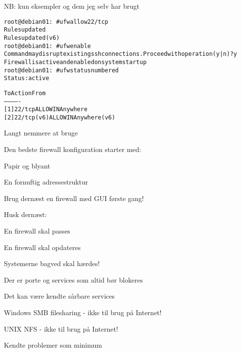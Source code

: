 \documentclass[Screen16to9,17pt]{foils}
\begin{document}
NB: kun eksempler og dem jeg selv har brugt



\begin{alltt}\footnotesize
root@debian01:~# ufw allow 22/tcp
Rules updated
Rules updated (v6)
root@debian01:~# ufw enable
Command may disrupt existing ssh connections. Proceed with operation (y|n)? y
Firewall is active and enabled on system startup
root@debian01:~# ufw status numbered
Status: active

     To                         Action      From
     --                         ------      ----
[ 1] 22/tcp                     ALLOW IN    Anywhere
[ 2] 22/tcp (v6)                ALLOW IN    Anywhere (v6)
\end{alltt}

Langt nemmere at bruge




\begin{list1}
\item Den bedste firewall konfiguration starter med:
\begin{list2}
\item Papir og blyant
\item En fornuftig adressestruktur
\end{list2}
\item Brug dernæst en firewall med GUI første gang!
\item Husk dernæst:
\begin{list2}
\item En firewall skal passes
\item En firewall skal opdateres
\item Systemerne bagved skal hærdes!
\end{list2}
\end{list1}





\begin{list1}
\item Der er porte og services som altid bør blokeres
\item Det kan være kendte sårbare services
\begin{list2}
\item Windows SMB filesharing - ikke til brug på Internet!
\item UNIX NFS - ikke til brug på Internet!
\end{list2}
\item Kendte problemer som minimum
\end{list1}
\end{document}
